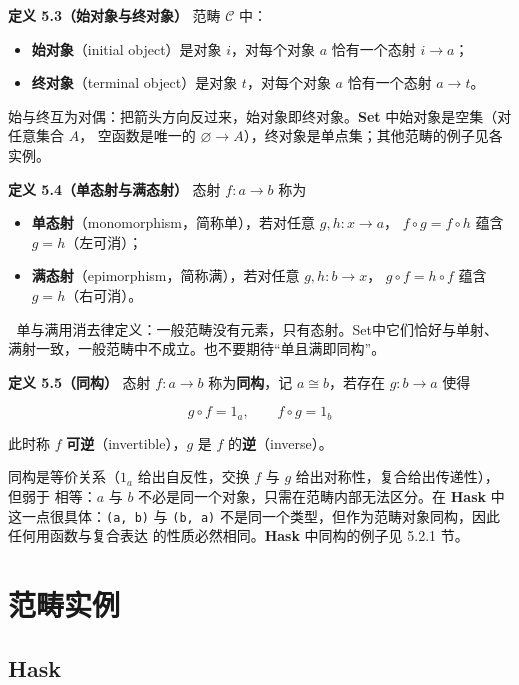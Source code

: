 \textbf{定义 5.3（始对象与终对象）} 范畴 \(\mathcal{C}\) 中：

\begin{itemize}
\tightlist
\item
  \textbf{始对象}（initial object）是对象 \(i\)，对每个对象 \(a\) 恰有一个态射 \(i \to a\)；
\item
  \textbf{终对象}（terminal object）是对象 \(t\)，对每个对象 \(a\) 恰有一个态射 \(a \to t\)。
\end{itemize}

始与终互为对偶：把箭头方向反过来，始对象即终对象。\textbf{Set} 中始对象是空集（对任意集合 \(A\)，
空函数是唯一的 \(\varnothing \to A\)），终对象是单点集；其他范畴的例子见各实例。

\textbf{定义 5.4（单态射与满态射）} 态射 \(f \colon a \to b\) 称为

\begin{itemize}
\tightlist
\item
  \textbf{单态射}（monomorphism，简称单），若对任意 \(g, h \colon x \to a\)，
  \(f \circ g = f \circ h\) 蕴含 \(g = h\)（左可消）；
\item
  \textbf{满态射}（epimorphism，简称满），若对任意 \(g, h \colon b \to x\)，
  \(g \circ f = h \circ f\) 蕴含 \(g = h\)（右可消）。
\end{itemize}

🦂 单与满用消去律定义：一般范畴没有元素，只有态射。Set中它们恰好与单射、满射一致，一般范畴中不成立。也不要期待“单且满即同构”。

\textbf{定义 5.5（同构）} 态射 \(f \colon a \to b\) 称为\textbf{同构}，记 \(a \cong b\)，若存在 \(g \colon b \to a\) 使得

\[g \circ f = 1_a, \qquad f \circ g = 1_b\]

此时称 \(f\) \textbf{可逆}（invertible），\(g\) 是 \(f\) 的\textbf{逆}（inverse）。

同构是等价关系（\(1_a\) 给出自反性，交换 \(f\) 与 \(g\) 给出对称性，复合给出传递性），但弱于
相等：\(a\) 与 \(b\) 不必是同一个对象，只需在范畴内部无法区分。在 \textbf{Hask} 中这一点很具体：\passthrough{\lstinline!(a, b)!} 与 \passthrough{\lstinline!(b, a)!} 不是同一个类型，但作为范畴对象同构，因此任何用函数与复合表达
的性质必然相同。\textbf{Hask} 中同构的例子见 5.2.1 节。

\section{范畴实例}\label{ux8303ux7574ux5b9eux4f8b}

\subsection{\texorpdfstring{\textbf{Hask}}{Hask}}\label{hask}

